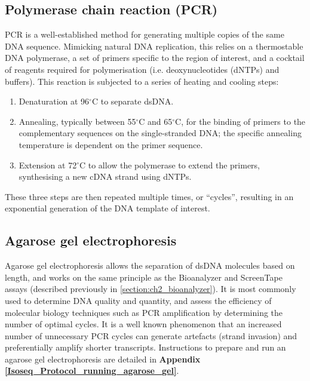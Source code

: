 \subsection{Polymerase chain reaction (PCR)}
\label{section:ch2_PCR_explanation} 
PCR is a well-established method for generating multiple copies of the same DNA sequence. Mimicking natural DNA replication, this relies on a thermostable DNA polymerase, a set of primers specific to the region of interest, and a cocktail of reagents required for polymerisation (i.e. deoxynucleotides (dNTPs) and buffers). This reaction is subjected to a series of heating and cooling steps: 
\begin{enumerate}
	\item Denaturation at 96$^{\circ}$C to separate dsDNA. 
	\item Annealing, typically between 55$^{\circ}$C  and 65$^{\circ}$C, for the binding of primers to the complementary sequences on the single-stranded DNA; the specific annealing temperature is dependent on the primer sequence. 
	\item Extension at 72$^{\circ}$C to allow the polymerase to extend the primers, synthesising a new cDNA strand using dNTPs.
\end{enumerate} 
These three steps are then repeated multiple times, or “cycles”, resulting in an exponential generation of the DNA template of interest.

\subsection{Agarose gel electrophoresis}
\label{section:ch2_agarose_explanation}  
Agarose gel electrophoresis allows the separation of dsDNA molecules based on length, and works on the same principle as the Bioanalyzer and ScreenTape assays (described previously in \cref{section:ch2_bioanalyzer}). It is most commonly used to determine DNA quality and quantity, and assess the efficiency of molecular biology techniques such as PCR amplification by determining the number of optimal cycles. It is a well known phenomenon that an increased number of unnecessary PCR cycles can generate artefacts (strand invasion) and preferentially amplify shorter transcripts\cite{Acinas2005,Bayega2018}. Instructions to prepare and run an agarose gel electrophoresis are detailed in \textbf{Appendix \ref{Isoseq_Protocol_running_agarose_gel}}.


